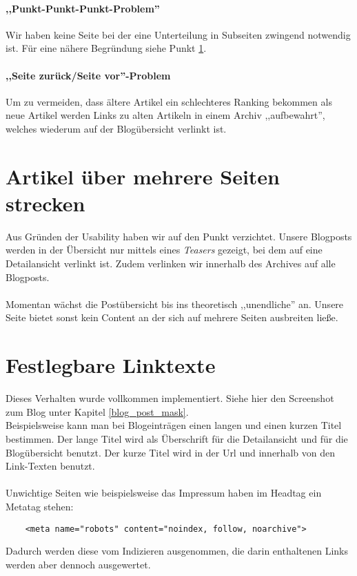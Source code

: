\paragraph{,,Punkt-Punkt-Punkt-Problem''}
Wir haben keine Seite bei der eine Unterteilung in Subseiten zwingend notwendig
ist. Für eine nähere Begründung siehe Punkt \ref{Content_Strecken}.

\paragraph{,,Seite zurück/Seite vor''-Problem}
Um zu vermeiden, dass ältere Artikel ein schlechteres Ranking bekommen als neue
Artikel werden Links zu alten Artikeln in einem Archiv ,,aufbewahrt'', welches
wiederum auf der Blogübersicht verlinkt ist.


\section{Artikel über mehrere Seiten strecken}
\label{Content_Strecken}
Aus Gründen der Usability haben wir auf den Punkt verzichtet. Unsere Blogposts
werden in der Übersicht nur mittels eines \emph{Teasers} gezeigt, bei dem auf
eine Detailansicht verlinkt ist. Zudem verlinken wir innerhalb des Archives auf
alle Blogposts. 
\\
\\
Momentan wächst die Postübersicht bis ins theoretisch ,,unendliche'' an.
Unsere Seite bietet sonst kein Content an der sich auf mehrere Seiten ausbreiten
ließe. 

\section{Festlegbare Linktexte}
Dieses Verhalten wurde vollkommen implementiert. Siehe hier den Screenshot zum
Blog unter Kapitel \ref{blog_post_mask}.
\\
Beispielsweise kann man bei Blogeinträgen einen langen und einen kurzen Titel
bestimmen. Der lange Titel wird als Überschrift für die Detailansicht und für
die Blogübersicht benutzt. Der kurze Titel wird in der Url und innerhalb von den
Link-Texten benutzt. 
\\
\\
Unwichtige Seiten wie beispielsweise das Impressum haben im Headtag ein Metatag
stehen:
\begin{verbatim}
    <meta name="robots" content="noindex, follow, noarchive">
\end{verbatim}
Dadurch werden diese vom Indizieren ausgenommen, die darin enthaltenen Links
werden aber dennoch ausgewertet.

